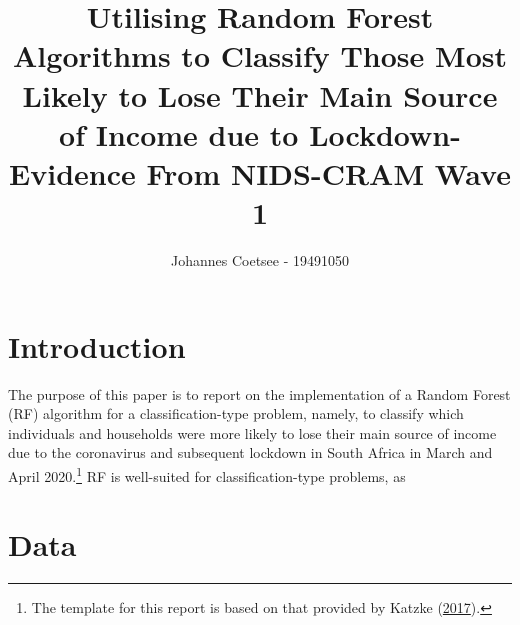 \documentclass[11pt,preprint, authoryear]{elsarticle}
\numberwithin{equation}{section}
\numberwithin{figure}{section}
\numberwithin{table}{section}
\let\rmarkdownfootnote\footnote%
\def\footnote{\protect\rmarkdownfootnote}
\begin{document}
\begin{frontmatter}  %

\title{Utilising Random Forest Algorithms to Classify Those Most Likely to Lose
Their Main Source of Income due to Lockdown- Evidence From NIDS-CRAM
Wave 1}





\author[Add1]{Johannes Coetsee - 19491050}





\address[Add1]{Stellenbosch University}



\vspace{1cm}

\vspace{0.5cm}
\end{frontmatter}



\pagestyle{fancy}
\chead{}
\lfoot{}
\lhead{}
\cfoot{}


\headsep 35pt %




\hypertarget{introduction}{%
\section{\texorpdfstring{Introduction
\label{Introduction}}{Introduction }}\label{introduction}}

The purpose of this paper is to report on the implementation of a Random
Forest (RF) algorithm for a classification-type problem, namely, to
classify which individuals and households were more likely to lose their
main source of income due to the coronavirus and subsequent lockdown in
South Africa in March and April 2020.\footnote{The template for this
  report is based on that provided by Katzke
  (\protect\hyperlink{ref-Texevier}{2017}).} RF is well-suited for
classification-type problems, as

\hypertarget{data}{%
\section{\texorpdfstring{Data \label{Data}}{Data }}\label{data}}
\end{document}
